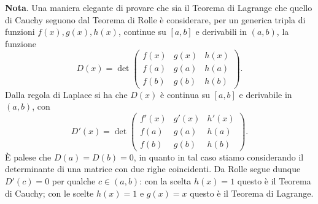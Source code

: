 \documentclass[a4paper,twoside]{article}
\theoremstyle{definition}
\numberwithin{theorem}{section}
\begin{document}
\begin{framed}
 \textbf{Nota}. Una maniera elegante di provare che sia il Teorema di Lagrange che quello di Cauchy seguono dal Teorema di Rolle è considerare, per un generica tripla di funzioni $f(x),g(x),h(x)$, continue su $[a,b]$ e derivabili in $(a,b)$, la funzione 
 $$ D(x)=\det\begin{pmatrix} f(x) & g(x) & h(x) \\ f(a) & g(a) & h(a) \\ f(b) & g(b) & h(b)\end{pmatrix}. $$
 Dalla regola di Laplace si ha che $D(x)$ è continua su $[a,b]$ e derivabile in $(a,b)$, con 
  $$ D'(x)=\det\begin{pmatrix} f'(x) & g'(x) & h'(x) \\ f(a) & g(a) & h(a) \\ f(b) & g(b) & h(b)\end{pmatrix}. $$
 È palese che $D(a)=D(b)=0$, in quanto in tal caso stiamo considerando il determinante di una matrice con due righe coincidenti. Da Rolle segue dunque $D'(c)=0$ per qualche $c\in(a,b)$: con la scelta $h(x)=1$ questo è il Teorema di Cauchy; con le scelte $h(x)=1$ e $g(x)=x$ questo è il Teorema di Lagrange.
\end{framed}
\end{document}
